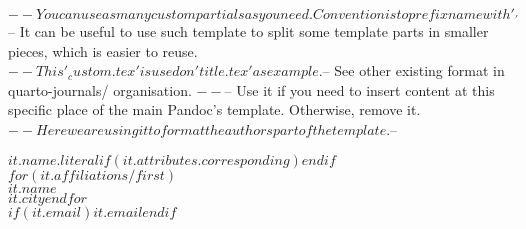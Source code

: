 $-- You can use as many custom partials as you need. Convention is to prefix name with '_'
$-- It can be useful to use such template to split some template parts in smaller pieces, which is easier to reuse. 
$-- This '_custom.tex' is used on 'title.tex' as example.
$-- See other existing format in quarto-journals/ organisation.
$-- %
$-- Use it if you need to insert content at this specific place of the main Pandoc's template. Otherwise, remove it.
$-- Here we are using it to format the authors part of the template.
$-- %

$it.name.literal$$if(it.attributes.corresponding)$$endif$\\
$for(it.affiliations/first)$\\
$it.name$\\
$it.city$$endfor$\\
$if(it.email)$\href{mailto:$it.email$}{$it.email$}$endif$